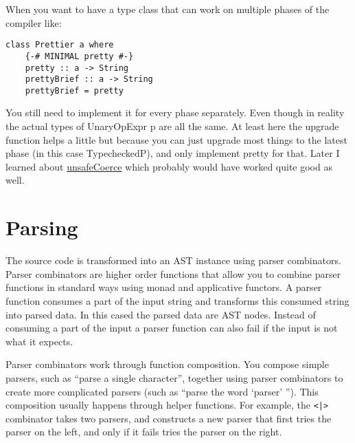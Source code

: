 \documentclass{report}
\begin{document}
When you want to have a type class that can work on multiple phases of the compiler like:

\begin{verbatim}
class Prettier a where
    {-# MINIMAL pretty #-}
    pretty :: a -> String
    prettyBrief :: a -> String
    prettyBrief = pretty
\end{verbatim}

You still need to implement it for every phase separately. Even though in reality the actual types of
UnaryOpExpr p are all the same. At least here the upgrade function helps a little but because you
can just upgrade most things to the latest phase (in this case TypecheckedP), and only implement
pretty for that. Later I learned about \href{https://hackage.haskell.org/package/base-4.20.0.1/docs/Unsafe-Coerce.html\#v:unsafeCoerce}{unsafeCoerce} which probably would have worked quite good as well.

\section{Parsing}

The source code is transformed into an AST instance using parser combinators. 
Parser combinators are higher order functions that allow you to combine parser functions in standard ways using monad and applicative functors. 
A parser function consumes a part of the input string and transforms this consumed string into parsed data.
In this cased the parsed data are AST nodes. 
Instead of consuming a part of the input a parser function can also fail if the input is not what it expects.

Parser combinators work through function composition. You compose simple parsers, such as “parse a single character”, together using parser combinators to create more complicated parsers (such as “parse the word ‘parser’ ”). This composition usually happens through helper functions. 
For example, the \texttt{<|>} combinator takes two parsers, and constructs a new parser that first tries the parser on the left, and only if it fails tries the parser on the right. 
\end{document}
